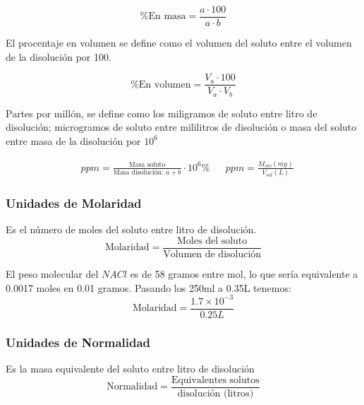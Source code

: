 \begin{equation}
	\text{\% En masa}=\frac{a\cdot 100}{a\cdot b}
\end{equation}

El procentaje en volumen se define como el volumen del soluto entre el volumen de la disolución por 100.

\begin{equation}
	\text{\% En volumen}=\frac{V_{a}\cdot 100}{V_{a}\cdot V_{b}}
\end{equation}

Partes por millón, se define como los miligramos de soluto entre litro de disolución; microgramos de soluto entre mililitros de disolución o masa del soluto entre masa de la disolución por $10^6$

\begin{align}
	 & ppm=\frac{\text{Masa soluto}}{\text{Masa disolución: } a+b}\cdot 10^6 \% &  & ppm=\frac{M_{sto}(mg)}{V_{sol}(L)}
\end{align}

\subsubsection{Unidades de Molaridad}
\begin{definition}[Molaridad]
	Es el número de moles del soluto entre litro de disolución.
	\begin{equation}
		\text{Molaridad} = \frac{\text{Moles del soluto}}{\text{Volumen de disolución}}
	\end{equation}
\end{definition}

\begin{problem}
El peso molecular del $NACl$ es de 58 gramos entre mol, lo que sería equivalente a 0.0017 moles en 0.01 gramos. Pasando los 250ml a 0.35L tenemos:
\begin{equation*}
	\text{Molaridad}= \frac{1{.}7\times 10^{-3}}{0.25L}
\end{equation*}
\end{problem}

\subsubsection{Unidades de Normalidad}

\begin{definition}[Normalidad]
	Es la masa equivalente del soluto entre litro de disolución
	\begin{equation}
		\text{Normalidad}=\frac{\text{Equivalentes solutos}}{\text{disolución (litros)}}
	\end{equation}
\end{definition}

